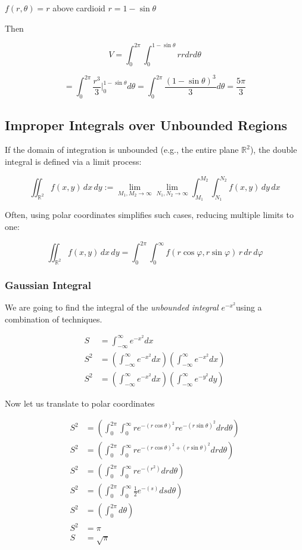 \(f(r, \theta) = r\) above cardioid \(r = 1 - \sin \theta\)

Then

\[
V = \int_{0}^{2\pi}\int_{0}^{1 - \sin \theta} r r dr d\theta
\]

\[
= \int_{0}^{2\pi}\frac{r^3}{3} |_{0}^{1 - \sin \theta} d\theta = \int_{0}^{2\pi} \frac{{(1 - \sin\theta)}^3}{3} d\theta = \frac{5 \pi}{3}
\]


\subsection{Improper Integrals over Unbounded Regions}

If the domain of integration is unbounded (e.g., the entire plane \( \mathbb{R}^2 \)), the double integral is defined via a limit process:

\[
\iint_{\mathbb{R}^2} f(x, y)\, dx\, dy := \lim_{M_1, M_2 \to \infty} \lim_{N_1, N_2 \to \infty}
\int_{M_1}^{M_2} \int_{N_1}^{N_2} f(x, y)\, dy\, dx
\]

Often, using polar coordinates simplifies such cases, reducing multiple limits to one:

\[
\iint_{\mathbb{R}^2} f(x, y)\, dx\, dy = \int_0^{2\pi} \int_0^{\infty} f(r \cos \varphi, r \sin \varphi)\, r\, dr\, d\varphi
\]


\subsubsection{Gaussian Integral}

We are going to find the integral of the \emph{unbounded integral} 
\(e^{-x^2}\)using a combination of techniques.

\begin{align*}
S &= \int_{-\infty}^{\infty} e^{-x^2}dx\\
S^2 &= \left(\int_{-\infty}^{\infty} e^{-x^2}dx\right) \left(\int_{-\infty}^{\infty} e^{-x^2}dx\right)\\
S^2 &= \left(\int_{-\infty}^{\infty} e^{-x^2}dx\right) \left(\int_{-\infty}^{\infty} e^{-y^2}dy\right)
\end{align*}

Now let us translate to polar coordinates

\begin{align*}
S^2 &= \left(\int_{0}^{2\pi} \int_{0}^{\infty}re^{-{(r\cos\theta)}^2} re^{-{(r\sin\theta)}^2}drd\theta\right)\\
S^2 &= \left(\int_{0}^{2\pi} \int_{0}^{\infty}re^{-{(r\cos\theta)}^2 + {(r\sin\theta)}^2}drd\theta\right)\\
S^2 &= \left(\int_{0}^{2\pi} \int_{0}^{\infty}re^{-(r^2)}drd\theta\right)\\
S^2 &=  \left(\int_{0}^{2\pi} \int_{0}^{\infty}\frac{1}{2}e^{-(s)}dsd\theta\right)\\
S^2 &= \left(\int_{0}^{2\pi}d\theta\right)\\
S^2 &= \pi\\
S   &= \sqrt{\pi}
\end{align*}

